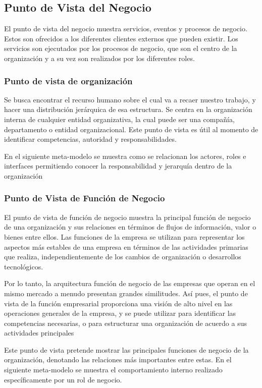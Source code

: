 \subsection{Punto de Vista del Negocio}
El punto de vista del negocio muestra servicios, eventos y procesos de negocio. Estos son ofrecidos a los diferentes clientes externos que pueden existir. Los servicios son ejecutados por los procesos de negocio, que son el centro de la organización y a su vez son realizados por los diferentes roles.

\subsubsection{Punto de vista de organización}
Se busca encontrar el recurso humano sobre el cual va a recaer nuestro trabajo, y hacer una distribución jerárquica de esa estructura. Se centra en la organización interna de cualquier entidad organizativa,
la cual puede ser una compañía, departamento o entidad organizacional.
Este punto de vista es útil al momento de identificar competencias,
autoridad y responsabilidades.

En el siguiente meta-modelo se muestra como se relacionan los actores,
roles e interfaces permitiendo conocer la responsabilidad y jerarquía
dentro de la organización

\subsubsection{Punto de Vista de Función de Negocio}
El punto de vista de función de negocio muestra la principal función de negocio de una organización y sus relaciones en términos de flujos de información, valor o bienes entre ellos.
Las funciones de la empresa se utilizan para representar los aspectos más estables de una empresa en términos de las actividades primarias que realiza, independientemente de los cambios de organización o desarrollos tecnológicos.

Por lo tanto, la arquitectura función de negocio de las empresas que operan en el mismo mercado a menudo presentan grandes similitudes. Así pues, el punto de vista de la función empresarial proporciona una visión de alto nivel en las operaciones generales de la empresa, y se puede utilizar para identificar las competencias necesarias, o para estructurar una organización  de acuerdo a sus actividades principales

Este punto de vista pretende mostrar las principales funciones de negocio de la organización, denotando las relaciones más importantes entre estas. En el siguiente meta-modelo se muestra el comportamiento interno realizado específicamente por un rol de negocio.

